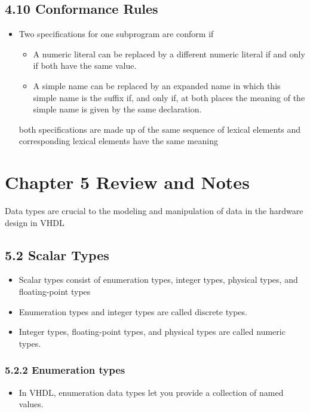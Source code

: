 \documentclass[a4paper,12pt]{article}
\begin{document}
	\subsection*{4.10 Conformance Rules}
	\begin{itemize}
		\item Two specifications for one subprogram are conform if 
		\begin{itemize}
			\item A numeric literal can be replaced by a different numeric literal if and only if both have the same
			value.
			\item A simple name can be replaced by an expanded name in which this simple name is the suffix if, and
			only if, at both places the meaning of the simple name is given by the same declaration.
		\end{itemize}
		both specifications are made up of the same sequence of lexical elements and corresponding lexical elements have the same meaning
	\end{itemize}
	
	\section*{Chapter 5 Review and Notes}
	Data types are crucial to the modeling and manipulation of data in the hardware design in VHDL
	
	\subsection*{5.2 Scalar Types}
	\begin{itemize}
		\item Scalar types consist of enumeration types, integer types, physical types, and floating-point types
		\item Enumeration types and integer types are called discrete types. 
		\item Integer types, floating-point types, and physical types are called numeric types.
	\end{itemize}
	
	\subsubsection*{5.2.2 Enumeration types}
	\begin{itemize}
		\item In VHDL, enumeration data types let you provide a collection of named values.
	\end{itemize}
	
\end{document}
